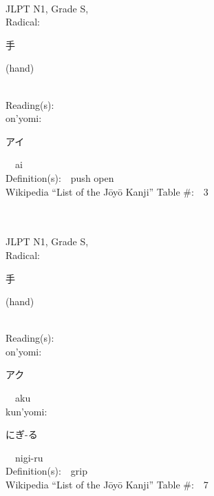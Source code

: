 \begin{multicols}{2}
{\fontsize{34pt}{40pt}  }\ \ \\
{JLPT N1, Grade S, \\Radical:\ \ {\begin{CJK}{UTF8}{min} 手 \end{CJK}} (hand) } \\
Reading(s):\ \ \\
{\hspace*{1em}}on'yomi:\ \ \\
{\hspace*{2em}}{\begin{CJK}{UTF8}{min} アイ \end{CJK}}\ \ ai\ \ \\
Definition(s):\ \ push open \\
Wikipedia ``List of the J\=oy\=o Kanji'' Table \#:\ \      3 \\
\ \ \\
{\fontsize{34pt}{40pt}  }\ \ \\
{JLPT N1, Grade S, \\Radical:\ \ {\begin{CJK}{UTF8}{min} 手 \end{CJK}} (hand) } \\
Reading(s):\ \ \\
{\hspace*{1em}}on'yomi:\ \ \\
{\hspace*{2em}}{\begin{CJK}{UTF8}{min} アク \end{CJK}}\ \ aku\ \ \\
{\hspace*{1em}}kun'yomi:\ \ \\
{\hspace*{2em}}{\begin{CJK}{UTF8}{min} にぎ-る \end{CJK}}\ \ nigi-ru\ \ \\
Definition(s):\ \ grip \\
Wikipedia ``List of the J\=oy\=o Kanji'' Table \#:\ \      7 \\
\ \ \\
{\fontsize{34pt}{40pt}  }\ \ \\

\end{multicols}

